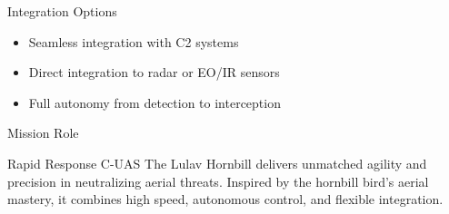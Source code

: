 \documentclass{beamer}
\begin{document}
\begin{frame}{Integration Options}
\begin{itemize}
    \item Seamless integration with C2 systems
    \item Direct integration to radar or EO/IR sensors
    \item Full autonomy from detection to interception
\end{itemize}
\end{frame}

\begin{frame}{Mission Role}
\begin{block}{Rapid Response C-UAS}
    The Lulav Hornbill delivers unmatched agility and precision in neutralizing aerial threats.
    Inspired by the hornbill bird's aerial mastery, it combines high speed, autonomous control, and flexible integration.
\end{block}
\end{frame}
\end{document}
